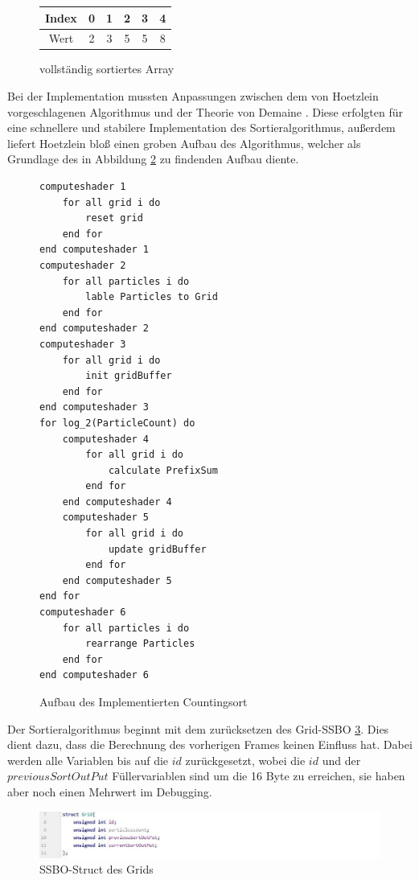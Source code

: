 \documentclass[intern,palatino]{cgBA}
\begin{document}
\begin{figure}[H]
	\centering
	\begin{tabular}{ | c || c | c | c | c | c |}
		\hline
		Index 				&  0 & 1 & 2 & 3 & 4 \\ \hline
		Wert				&  2 & 3 & 5 & 5 & 8 \\
		\hline
	\end{tabular}
	\caption{vollständig sortiertes Array}
	\label{tab:Counting4}
\end{figure}

\newpage

Bei der Implementation mussten Anpassungen zwischen dem von Hoetzlein \cite{nvidia} vorgeschlagenen Algorithmus und der Theorie von Demaine \cite{counting}. Diese erfolgten für eine schnellere und stabilere Implementation des Sortieralgorithmus, außerdem liefert Hoetzlein bloß einen groben Aufbau des Algorithmus, welcher als Grundlage des in Abbildung \ref{code:Counting} zu findenden Aufbau diente.
\newline

\begin{figure}[H]
	\centering
	\begin{lstlisting}
computeshader 1
	for all grid i do
		reset grid
	end for
end computeshader 1
computeshader 2
	for all particles i do
		lable Particles to Grid
	end for
end computeshader 2
computeshader 3
	for all grid i do
		init gridBuffer
	end for
end computeshader 3
for log_2(ParticleCount) do
	computeshader 4
		for all grid i do
			calculate PrefixSum
		end for
	end computeshader 4
	computeshader 5
		for all grid i do
			update gridBuffer
		end for
	end computeshader 5
end for
computeshader 6
	for all particles i do
		rearrange Particles
	end for
end computeshader 6
	\end{lstlisting}
	\caption{Aufbau des Implementierten Countingsort}
	\label{code:Counting}
\end{figure}
\newpage

Der Sortieralgorithmus beginnt mit dem zurücksetzen des Grid-SSBO \ref{img:GridStruct}. Dies dient dazu, dass die  Berechnung des vorherigen Frames keinen Einfluss hat. Dabei werden alle Variablen bis auf die $id$ zurückgesetzt, wobei die $id$ und der $previousSortOutPut$ Füllervariablen sind um die 16 Byte zu erreichen, sie haben aber noch einen Mehrwert im Debugging.

\begin{figure}[H]
	\centering
	\includegraphics[width=1.3\columnwidth]{Bilder/GridStruct.jpg}
	\caption{SSBO-Struct des Grids}
	\label{img:GridStruct}
\end{figure}
\end{document}
